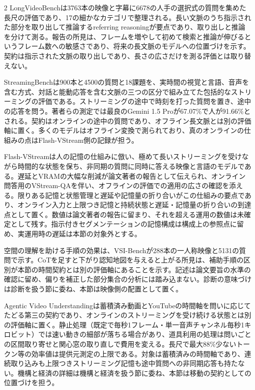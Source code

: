 \documentclass[lualatex,a4paper,10pt]{jlreq}
\begin{document}
\begin{multicols}{2}
\noindent LongVideoBenchは3763本の映像と字幕に6678の人手の選択式の質問を集めた長尺の評価であり、17の細かなカテゴリで整理される。長い文脈のうち指示された部分を取り出して推論するreferring reasoningが要点であり、取り出しと推論を分けて測る。報告の所見は、フレームを増やして初めて検索と推論が伸びるというフレーム数への敏感さであり、将来の長文脈のモデルへの位置づけを示す。契約は指示された文脈の取り出しであり、長さの広さだけを測る評価とは取り替えない。\autocite{vmd087}\par\medskip
\noindent StreamingBenchは900本と4500の質問と18課題を、実時間の視覚と言語、音声を含む方式、対話と能動応答を含む文脈の三つの区分で組み立てた包括的なストリーミングの評価である。ストリーミングの途中で時刻を打った質問を置き、途中の応答を問う。著者らの測定では最良のGemini 1.5 Proが67.07\%で人が91.66\%とされる。契約はオンラインの途中の質問であり、オフライン長文脈とは別の評価軸に置く。多くのモデルはオフライン変換で測られており、真のオンラインの仕組みの点はFlash-VStream側の記録が担う。\autocite{vmd088}\par\medskip
\noindent Flash-VStreamは人の記憶の仕組みに倣い、極めて長いストリーミングを受けながら時間的な状態を保ち、非同期の質問に同時に答える映像と言語のモデルである。遅延とVRAMの大幅な削減が論文著者の報告として伝えられ、オンライン問答用のVStream-QAを伴い、オフラインの評価での適用の広さの確認を添える。限りある記憶と状態管理と遅延や記憶量の折り合いがこの仕組みの要点であり、オンライン入力と上限つき記憶と持続状態と遅延・記憶量の折り合いの到達点として置く。数値は論文著者の報告に留まり、それを超える運用の数値は未確定として残す。指示付きセグメンテーションの記憶構成は構成上の参照点に留め、実運用時の遅延は本節の対象外とする。\autocite{vmd089}\par\medskip
\noindent 空間の理解を助ける手順の効果は、VSI-Benchが288本の一人称映像と5131の質問で示す。CoTを足すと下がり認知地図を与えると上がる所見は、補助手順の区別が本節の時間契約とは別の評価軸にあることを示す。記述は論文要旨の水準の確認に留め、偏りを補正した部分集合の分析には踏み込まない。診断の意味づけは診断を扱う節に委ね、本節は映像側の配置として置く。\autocite{vmd111}\par\medskip
\noindent Agentic Video Understandingは蓄積済み動画とYouTubeの時間軸を問いに応じてたどる第三の契約であり、オンラインのストリーミングを受け続ける状態とは別の評価軸に置く。静止処理（既定で毎秒1フレーム・単一音声チャンネル毎秒1キロビット）では速い動きの細部が落ちる場合があり、道具利用の処理は問いごとの区間取り寄せと関心窓の取り直しで費用を変える。長尺で最大88\%少ないトークン等の効率値は提供元測定の上限である。対象は蓄積済みの時間軸であり、連続取り込みも上限つきストリーミング記憶も途中質問への非同期応答も持たない。機構と経済の詳細は機構と経済を扱う節に委ね、本節は移動の契約としての位置づけを担う。\autocite{vmd112}\par\medskip

\end{multicols}
\end{document}
